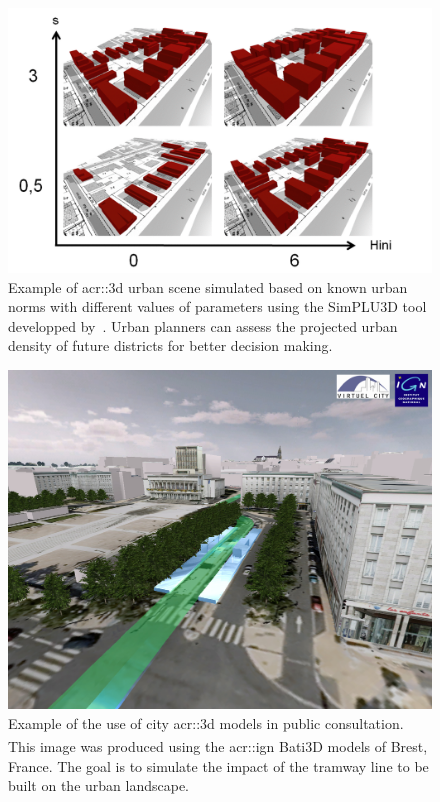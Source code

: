             \begin{figure}[htpb]
                \centering
                \includegraphics[width=\textwidth]{images/introduction/3d_model_applications/simplu}
                \caption{
                    \label{fig::3d_simulation} Example of \gls{acr::3d} urban scene simulated based on known urban norms with different values of parameters using the SimPLU3D tool developped by~\textcite{brasebin2017stochastic}.
                    Urban planners can assess the projected urban density of future districts for better decision making.
                }
            \end{figure}
            \begin{figure}[htpb]
                \centering
                \includegraphics[width=\textwidth]{images/introduction/3d_model_applications/brest_tramway}
                \caption{
                    \label{fig::public_consultation} Example of the use of city \gls{acr::3d} models in public consultation.
                    This image was produced using the \gls{acr::ign} Bati3D\textsuperscript{\textregistered} models of Brest, France.
                    The goal is to simulate the impact of the tramway line to be built on the urban landscape.
                }
            \end{figure}
